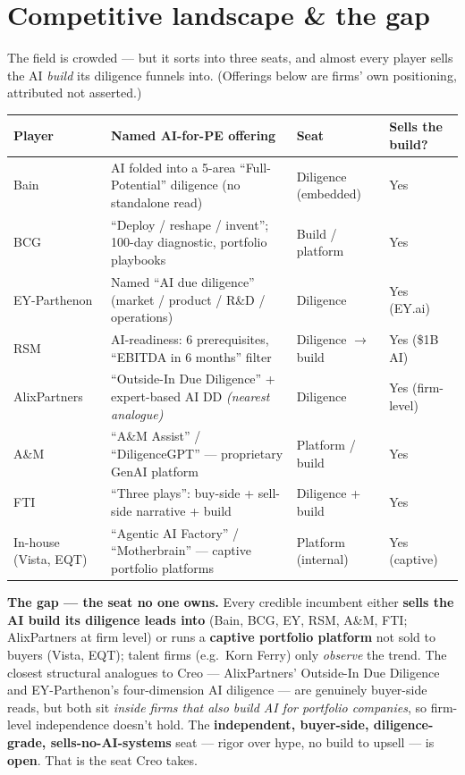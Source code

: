 \documentclass[11pt]{article}
\begin{document}
\section{Competitive landscape \& the gap}
The field is crowded --- but it sorts into three seats, and almost every player sells the AI
\emph{build} its diligence funnels into. (Offerings below are firms' own positioning, attributed
not asserted.)

\begin{center}
\renewcommand{\arraystretch}{1.25}\small
\begin{tabular}{p{2.3cm} p{5.3cm} p{2.2cm} p{2.2cm}}
\toprule
\textbf{Player} & \textbf{Named AI-for-PE offering} & \textbf{Seat} & \textbf{Sells the build?} \\
\midrule
Bain & AI folded into a 5-area ``Full-Potential'' diligence (no standalone read) & Diligence (embedded) & Yes \\
BCG & ``Deploy / reshape / invent''; 100-day diagnostic, portfolio playbooks & Build / platform & Yes \\
EY-Parthenon & Named ``AI due diligence'' (market / product / R\&D / operations) & Diligence & Yes (EY.ai) \\
RSM & AI-readiness: 6 prerequisites, ``EBITDA in 6 months'' filter & Diligence $\to$ build & Yes (\$1B AI) \\
AlixPartners & ``Outside-In Due Diligence'' + expert-based AI DD \emph{(nearest analogue)} & Diligence & Yes (firm-level) \\
A\&M & ``A\&M Assist'' / ``DiligenceGPT'' --- proprietary GenAI platform & Platform / build & Yes \\
FTI & ``Three plays'': buy-side + sell-side narrative + build & Diligence + build & Yes \\
In-house (Vista, EQT) & ``Agentic AI Factory'' / ``Motherbrain'' --- captive portfolio platforms & Platform (internal) & Yes (captive) \\
\bottomrule
\end{tabular}
\end{center}

\textbf{The gap --- the seat no one owns.} Every credible incumbent either \textbf{sells the AI
build its diligence leads into} (Bain, BCG, EY, RSM, A\&M, FTI; AlixPartners at firm level) or runs
a \textbf{captive portfolio platform} not sold to buyers (Vista, EQT); talent firms (e.g.\ Korn
Ferry) only \emph{observe} the trend. The closest structural analogues to Creo --- AlixPartners'
Outside-In Due Diligence and EY-Parthenon's four-dimension AI diligence --- are genuinely buyer-side
reads, but both sit \emph{inside firms that also build AI for portfolio companies}, so firm-level
independence doesn't hold. The \textbf{independent, buyer-side, diligence-grade,
sells-no-AI-systems} seat --- rigor over hype, no build to upsell --- is \textbf{open}. That is the
seat Creo takes.
\end{document}
